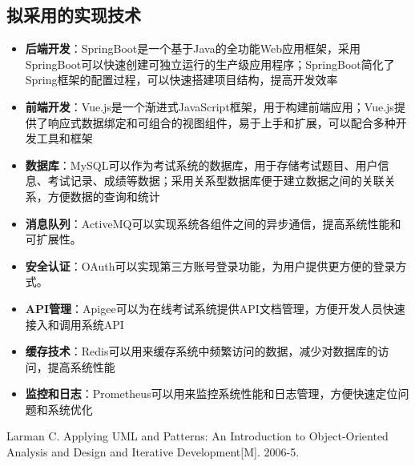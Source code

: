 \documentclass{article}
\begin{document}
\subsection{拟采用的实现技术}
\begin{itemize}
    \item \textbf{后端开发}：SpringBoot是一个基于Java的全功能Web应用框架，采用SpringBoot可以快速创建可独立运行的生产级应用程序；SpringBoot简化了Spring框架的配置过程，可以快速搭建项目结构，提高开发效率
    \item \textbf{前端开发}：Vue.js是一个渐进式JavaScript框架，用于构建前端应用；Vue.js提供了响应式数据绑定和可组合的视图组件，易于上手和扩展，可以配合多种开发工具和框架
    \item \textbf{数据库}：MySQL可以作为考试系统的数据库，用于存储考试题目、用户信息、考试记录、成绩等数据；采用关系型数据库便于建立数据之间的关联关系，方便数据的查询和统计
    \item \textbf{消息队列}：ActiveMQ可以实现系统各组件之间的异步通信，提高系统性能和可扩展性。
    \item \textbf{安全认证}：OAuth可以实现第三方账号登录功能，为用户提供更方便的登录方式。
    \item \textbf{API管理}：Apigee可以为在线考试系统提供API文档管理，方便开发人员快速接入和调用系统API
    \item \textbf{缓存技术}：Redis可以用来缓存系统中频繁访问的数据，减少对数据库的访问，提高系统性能
    \item \textbf{监控和日志}：Prometheus可以用来监控系统性能和日志管理，方便快速定位问题和系统优化
\end{itemize}




\begin{thebibliography}{99}
Larman C. Applying UML and Patterns: An Introduction to Object-Oriented Analysis and Design and Iterative Development[M]. 2006-5.
\end{thebibliography}
\end{document}
